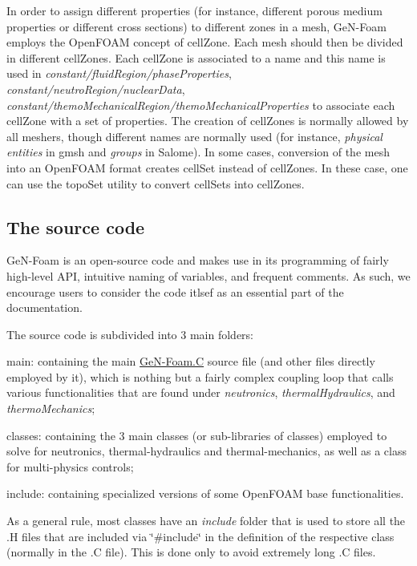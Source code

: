 In order to assign different properties (for instance, different porous medium properties or different cross sections) to different zones in a mesh, Ge\+N-\/\+Foam employs the Open\+F\+O\+AM concept of cell\+Zone. Each mesh should then be divided in different cell\+Zones. Each cell\+Zone is associated to a name and this name is used in {\itshape constant/fluid\+Region/phase\+Properties}, {\itshape constant/neutro\+Region/nuclear\+Data}, {\itshape constant/themo\+Mechanical\+Region/themo\+Mechanical\+Properties} to associate each cell\+Zone with a set of properties. The creation of cell\+Zones is normally allowed by all meshers, though different names are normally used (for instance, {\itshape physical entities} in gmsh and {\itshape groups} in Salome). In some cases, conversion of the mesh into an Open\+F\+O\+AM format creates cell\+Set instead of cell\+Zones. In these case, one can use the topo\+Set utility to convert cell\+Sets into cell\+Zones.

\subsection*{The source code}

Ge\+N-\/\+Foam is an open-\/source code and makes use in its programming of fairly high-\/level A\+PI, intuitive naming of variables, and frequent comments. As such, we encourage users to consider the code itlsef as an essential part of the documentation.

The source code is subdivided into 3 main folders\+:
\begin{DoxyItemize}
\item main\+: containing the main \hyperlink{GeN-Foam_8C}{Ge\+N-\/\+Foam.\+C} source file (and other files directly employed by it), which is nothing but a fairly complex coupling loop that calls various functionalities that are found under {\itshape neutronics}, {\itshape thermal\+Hydraulics}, and {\itshape thermo\+Mechanics};
\item classes\+: containing the 3 main classes (or sub-\/libraries of classes) employed to solve for neutronics, thermal-\/hydraulics and thermal-\/mechanics, as well as a class for multi-\/physics controls;
\item include\+: containing specialized versions of some Open\+F\+O\+AM base functionalities.
\end{DoxyItemize}

As a general rule, most classes have an {\itshape include} folder that is used to store all the .H files that are included via \char`\"{}\#include\char`\"{} in the definition of the respective class (normally in the .C file). This is done only to avoid extremely long .C files.


